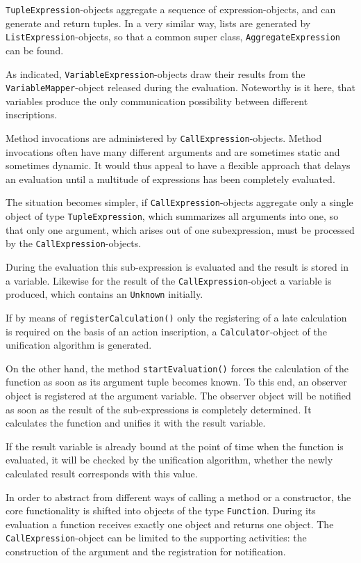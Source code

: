 \texttt{TupleExpression}-objects aggregate a sequence of
expression-objects, and can generate and return tuples.
In a very similar way, lists are generated by 
\texttt{ListExpression}-objects, so that a common super class,
\texttt{AggregateExpression} can be found.

As indicated, \texttt{VariableExpression}-objects draw their
results from the \texttt{VariableMapper}-object released during the
evaluation. Noteworthy is it here, that variables produce the only
communication possibility between different inscriptions.

Method invocations are administered by \texttt{CallExpression}-objects.
Method invocations often have many different arguments and are
sometimes static and sometimes dynamic.
It would thus appeal to have a flexible approach that delays
an evaluation until a multitude of expressions has been
completely evaluated.

The situation becomes simpler, if \texttt{CallExpression}-objects
aggregate only a single object of type 
\texttt{TupleExpression}, which summarizes all
arguments into one, so that only one argument, which arises
out of one subexpression, must be processed by
the \texttt{CallExpression}-objects.

During the evaluation this sub-expression is evaluated and the
result is stored in a variable. Likewise for the result of the
\texttt{CallExpression}-object a variable is produced, which contains
an \texttt{Unknown} initially.

If by means of \texttt{registerCalculation()} only the registering of a late
calculation is required on the basis of an action inscription,
a \texttt{Calculator}-object of the
unification algorithm is generated.

On the other hand, the method \texttt{startEvaluation()} forces the
calculation of the function as soon as its argument tuple becomes known.
To this end, an observer object is registered at the argument variable.
The observer object will be notified as soon as the result of the
sub-expressions is completely determined. It calculates the function and
unifies it with the result variable.

If the result variable is already bound 
at the point of time when the function is evaluated,
it will be checked by the unification algorithm,
whether the newly calculated result corresponds with this value.

In order to abstract from different ways of calling a method or
a constructor, the core functionality is shifted into objects of the type
\texttt{Function}. During its evaluation a function receives exactly one
object and returns one object. The \texttt{CallExpression}-object can
be limited to the supporting activities: the construction of the
argument and the registration for notification.

